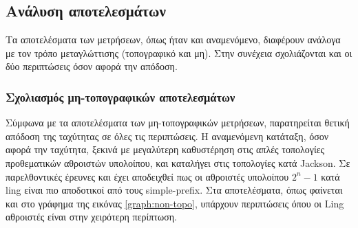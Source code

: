 


   














\subsection{Ανάλυση αποτελεσμάτων}
Τα αποτελέσματα των μετρήσεων, όπως ήταν και αναμενόμενο, διαφέρουν ανάλογα με τον τρόπο μεταγλώττισης (τοπογραφικό και μη). Στην συνέχεια σχολιάζονται και οι δύο περιπτώσεις όσον αφορά την απόδοση. 

\subsubsection{Σχολιασμός μη-τοπογραφικών αποτελεσμάτων}
Σύμφωνα με τα αποτελέσματα των μη-τοπογραφικών μετρήσεων, παρατηρείται θετική απόδοση της ταχύτητας σε όλες τις περιπτώσεις. Η αναμενόμενη κατάταξη, όσον αφορά την ταχύτητα, ξεκινά με μεγαλύτερη καθυστέρηση στις απλές τοπολογίες προθεματικών αθροιστών υπολοίπου, και καταλήγει στις τοπολογίες κατά Jackson. Σε παρελθοντικές έρευνες \cite{1377160} και \cite{4633502} έχει αποδειχθεί πως οι αθροιστές υπολοίπου $2^n-1$ κατά ling είναι πιο αποδοτικοί από τους simple-prefix. Στα αποτελέσματα, όπως φαίνεται και στο γράφημα της εικόνας \ref{graph:non-topo}, υπάρχουν περιπτώσεις όπου οι Ling αθροιστές είναι στην χειρότερη περίπτωση.

